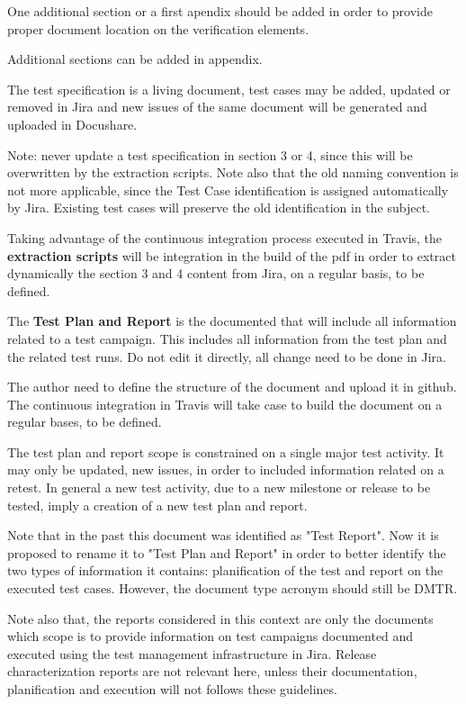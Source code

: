 One additional section or a first apendix should be added in order to provide proper document location on the verification elements.

Additional sections can be added in appendix.

The test specification is a living document, test cases may be added, updated or removed in Jira and new issues of the same document will be generated and uploaded in Docushare.

Note: never update a test specification in section 3 or 4, since this will be overwritten by the extraction scripts. Note also that the old naming convention is not more applicable, since the Test Case identification is assigned automatically by Jira. Existing test cases will preserve the old identification in the subject.

Taking advantage of the continuous integration process executed in Travis, the {\bf extraction scripts} will be integration in the build of the pdf in order to extract dynamically the section 3 and 4 content from Jira, on a regular basis, to be defined.


The {\bf Test Plan and Report} is the documented that will include all information related to a test campaign. 
This includes all information from the test plan and the related test runs. 
Do not edit it directly, all change need to be done in Jira.

The author need to define the structure of the document and upload it in github. The continuous integration in Travis will take case to build the document on a regular bases, to be defined.

The test plan and report scope is constrained on a single major test activity. It may only be updated, new issues, in order to included information related on a retest.
In general a new test activity, due to a new milestone or release to be tested, imply a creation of a new test plan and report.

Note that in the past this document was identified as "Test Report".
Now it is proposed to rename it to "Test Plan and Report" in order to better identify the two types of information it contains: planification of the test and report on the executed test cases. However, the document type acronym should still be DMTR. 

Note also that, the reports considered in this context are only the documents which scope is to provide information on test campaigns documented and executed using the test management infrastructure in Jira. Release characterization reports are not relevant here, unless their documentation, planification and execution will not follows these guidelines.


